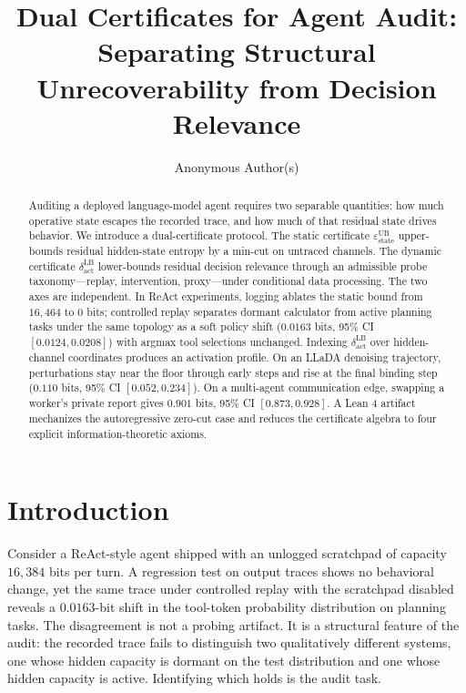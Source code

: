 \documentclass{article}
\title{Dual Certificates for Agent Audit: Separating Structural Unrecoverability from Decision Relevance}
\author{
  Anonymous Author(s) \\
}
\begin{document}
\maketitle

\begin{abstract}
Auditing a deployed language-model agent requires two separable quantities: how much operative state escapes the recorded trace, and how much of that residual state drives behavior. We introduce a dual-certificate protocol. The static certificate $\varepsilon_\text{state}^\text{UB}$ upper-bounds residual hidden-state entropy by a min-cut on untraced channels. The dynamic certificate $\delta_\text{act}^\text{LB}$ lower-bounds residual decision relevance through an admissible probe taxonomy---replay, intervention, proxy---under conditional data processing. The two axes are independent. In ReAct experiments, logging ablates the static bound from $16{,}464$ to $0$ bits; controlled replay separates dormant calculator from active planning tasks under the same topology as a soft policy shift ($0.0163$ bits, 95\% CI $[0.0124,0.0208]$) with argmax tool selections unchanged. Indexing $\delta_\text{act}^\text{LB}$ over hidden-channel coordinates produces an activation profile. On an LLaDA denoising trajectory, perturbations stay near the floor through early steps and rise at the final binding step ($0.110$ bits, 95\% CI $[0.052,0.234]$). On a multi-agent communication edge, swapping a worker's private report gives $0.901$ bits, 95\% CI $[0.873,0.928]$. A Lean 4 artifact mechanizes the autoregressive zero-cut case and reduces the certificate algebra to four explicit information-theoretic axioms.
\end{abstract}

\section{Introduction}
\label{sec:introduction}

Consider a ReAct-style agent shipped with an unlogged scratchpad of capacity $16{,}384$ bits per turn. A regression test on output traces shows no behavioral change, yet the same trace under controlled replay with the scratchpad disabled reveals a $0.0163$-bit shift in the tool-token probability distribution on planning tasks. The disagreement is not a probing artifact. It is a structural feature of the audit: the recorded trace fails to distinguish two qualitatively different systems, one whose hidden capacity is dormant on the test distribution and one whose hidden capacity is active. Identifying which holds is the audit task.
\end{document}

